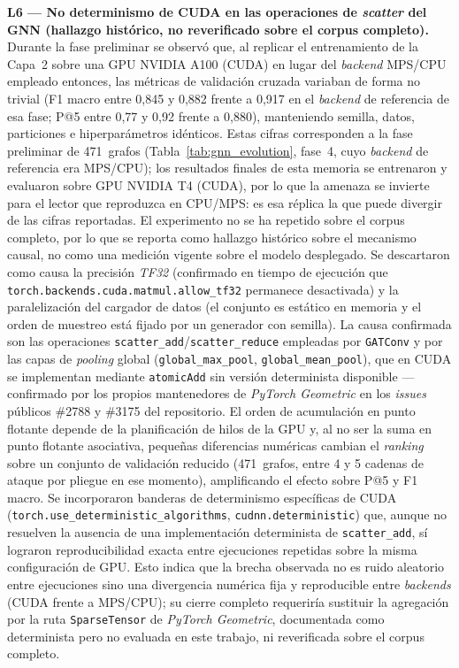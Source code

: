 \textbf{L6 — No determinismo de CUDA en las operaciones de \textit{scatter} del
\ac{GNN} (hallazgo histórico, no reverificado sobre el corpus completo).} Durante
la fase preliminar se observó que, al replicar el entrenamiento de la Capa~2
sobre una GPU NVIDIA A100 (CUDA) en lugar del \textit{backend} MPS/CPU empleado
entonces, las métricas de validación cruzada variaban de forma no trivial (F1
macro entre 0,845 y 0,882 frente a 0,917 en el \textit{backend} de referencia de
esa fase; P@5 entre 0,77 y 0,92 frente a 0,880), manteniendo semilla, datos,
particiones e hiperparámetros idénticos. Estas cifras corresponden a la fase
preliminar de 471~grafos (Tabla~\ref{tab:gnn_evolution}, fase~4, cuyo
\textit{backend} de referencia era MPS/CPU); los resultados finales de esta
memoria se entrenaron y evaluaron sobre GPU NVIDIA T4 (CUDA), por lo que la
amenaza se invierte para el lector que reproduzca en CPU/MPS: es esa réplica la
que puede divergir de las cifras reportadas. El experimento no se ha repetido
sobre el corpus completo, por lo que se reporta como hallazgo histórico sobre el
mecanismo causal, no como una medición vigente sobre el modelo desplegado. Se descartaron como causa la precisión \textit{TF32}
(confirmado en tiempo de ejecución que
\texttt{torch.backends.cuda.matmul.allow\_tf32} permanece desactivada) y la
paralelización del cargador de datos (el conjunto es estático en memoria y el orden
de muestreo está fijado por un generador con semilla). La causa confirmada son las
operaciones \texttt{scatter\_add}/\texttt{scatter\_reduce} empleadas por
\texttt{GATConv} y por las capas de \textit{pooling} global
(\texttt{global\_max\_pool}, \texttt{global\_mean\_pool}), que en CUDA se
implementan mediante \texttt{atomicAdd} sin versión determinista disponible —
confirmado por los propios mantenedores de \textit{PyTorch Geometric} en los
\textit{issues} públicos \#2788 y \#3175 del repositorio. El orden de acumulación
en punto flotante depende de la planificación de hilos de la GPU y, al no ser
la suma en punto flotante asociativa, pequeñas diferencias numéricas cambian el
\textit{ranking} sobre un conjunto de validación reducido (471~grafos, entre 4 y 5
cadenas de ataque por pliegue en ese momento), amplificando el efecto sobre P@5 y
F1 macro. Se incorporaron banderas de determinismo específicas de CUDA
(\texttt{torch.use\_deterministic\_algorithms}, \texttt{cudnn.deterministic}) que,
aunque no resuelven la ausencia de una implementación determinista de
\texttt{scatter\_add}, sí lograron reproducibilidad exacta entre ejecuciones
repetidas sobre la misma configuración de GPU. Esto indica que la brecha
observada no es ruido aleatorio entre ejecuciones sino una divergencia numérica fija
y reproducible entre \textit{backends} (CUDA frente a MPS/CPU); su cierre completo
requeriría sustituir la agregación por la ruta \texttt{SparseTensor} de
\textit{PyTorch Geometric}, documentada como determinista pero no evaluada en este
trabajo, ni reverificada sobre el corpus completo.

